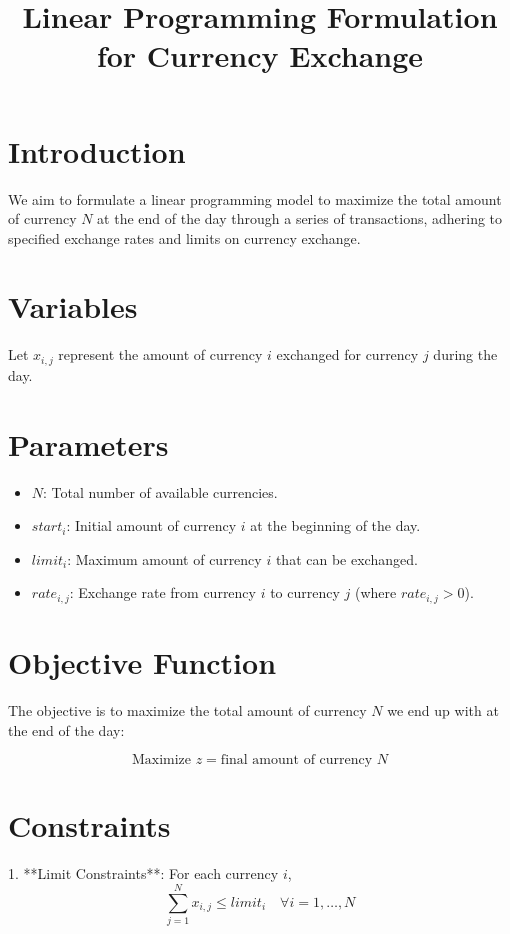 \documentclass{article}
\begin{document}
\title{Linear Programming Formulation for Currency Exchange}
\author{}
\date{}
\maketitle

\section*{Introduction}
We aim to formulate a linear programming model to maximize the total amount of currency \(N\) at the end of the day through a series of transactions, adhering to specified exchange rates and limits on currency exchange.

\section*{Variables}
Let \(x_{i,j}\) represent the amount of currency \(i\) exchanged for currency \(j\) during the day.

\section*{Parameters}
\begin{itemize}
    \item \(N\): Total number of available currencies.
    \item \(start_i\): Initial amount of currency \(i\) at the beginning of the day.
    \item \(limit_i\): Maximum amount of currency \(i\) that can be exchanged.
    \item \(rate_{i,j}\): Exchange rate from currency \(i\) to currency \(j\) (where \(rate_{i,j} > 0\)).
\end{itemize}

\section*{Objective Function}
The objective is to maximize the total amount of currency \(N\) we end up with at the end of the day:

\[
\text{Maximize } z = \text{final amount of currency } N
\]

\section*{Constraints}
1. **Limit Constraints**: For each currency \(i\),
   \[
   \sum_{j=1}^{N} x_{i,j} \leq limit_i \quad \forall i = 1, \ldots, N
   \]
\end{document}
